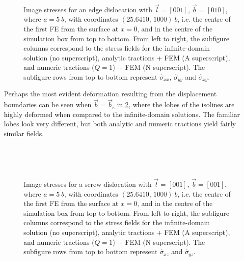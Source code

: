 \documentclass[11pt]{iopart}
\begin{document}
\begin{figure}
    ~
    ~
    \caption{Image stresses for an edge dislocation with $\vec{l} = [0 0 1]$, $\vec{b} = [0 1 0]$, where $a = 5~b$, with coordinates $(25.6410,\, 1000)~b$, i.e. the centre of the first FE from the surface at $x=0$, and in the centre of the simulation box from top to bottom. From left to right, the subfigure columns correspond to the stress fields for the infinite-domain solution (no superscript), analytic tractions + FEM (A superscript), and numeric tractions ($Q = 1$) + FEM (N superscript). The subfigure rows from top to bottom represent $\hat{\sigma}_{xx}$, $\hat{\sigma}_{yy}$ and $\hat{\sigma}_{xy}$.}
    \label{f:head_vs_ana_vs_num_epar}
\end{figure}

Perhaps the most evident deformation resulting from the displacement boundaries can be seen when $\vec{b} = \vec{b}_{\textrm{s}}$ in \cref{f:head_vs_ana_vs_num_screw}, where the lobes of the isolines are highly deformed when compared to the infinite-domain solutions. The familiar lobes look very different, but both analytic and numeric tractions yield fairly similar fields.
\begin{figure}
    \centering
    ~
    ~

    ~
    ~
    \caption{Image stresses for a screw dislocation with $\vec{l} = [0 0 1]$, $\vec{b} = [0 0 1]$, where $a = 5~b$, with coordinates $(25.6410,\, 1000)~b$, i.e. the centre of the first FE from the surface at $x=0$, and in the centre of the simulation box from top to bottom. From left to right, the subfigure columns correspond to the stress fields for the infinite-domain solution (no superscript), analytic tractions + FEM (A superscript), and numeric tractions ($Q = 1$) + FEM (N superscript). The subfigure rows from top to bottom represent $\hat{\sigma}_{xz}$ and $\hat{\sigma}_{yz}$.}
    \label{f:head_vs_ana_vs_num_screw}
\end{figure}
\end{document}
